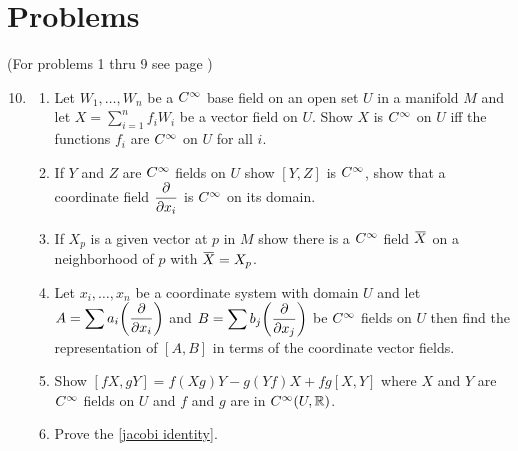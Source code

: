 \documentclass[../main]{subfiles}
\begin{document}
\section*{Problems}

(For problems 1 thru 9 see page \pageref{ch01:ex1})

\begin{enumerate}
\setcounter{enumi}{9}

\item\label{pro:10}
\begin{enumerate}[label=(\roman{enumii})]
    \item Let $W_1,\dots, W_n$ be a $C^\infty$ base field on an open set $U$ in a manifold $M$ and let $X = \sum\limits_{i=1}^{n} f_i W_i$ be a vector field on $U$. Show $X$ is $C^\infty$ on $U$ iff the functions $f_i$ are $C^\infty$ on $U$ for all $i$.
    \item If $Y$ and $Z$ are $C^\infty$ fields on $U$ show $[Y,Z]$ is $C^\infty$, show that a coordinate field $\dfrac{\partial }{\partial x_i}$ is $C^\infty$ on its domain.
    \item If $X_p$ is a given vector at $p$ in $M$ show there is a $C^\infty$ field $\xoverline{X}$ on a neighborhood of $p$ with $\xoverline{X} = X_p$.
    \item Let $x_i, \dots, x_n$ be a coordinate system with domain $U$ and let \newline $A = \displaystyle \sum a_i \bigg(\dfrac{\partial }{\partial x_i}\bigg)$ and $B=\displaystyle \sum b_j \bigg(\dfrac{\partial }{\partial x_j}\bigg)$ be $C^\infty$ fields on $U$ then find the representation of $[A,B]$ in terms of the coordinate vector fields.
    \item Show $[fX,gY] = f(Xg)Y - g(Yf)X + fg[X,Y]$ where $X$ and $Y$ are $C^\infty$ fields on $U$ and $f$ and $g$ are in $C^\infty(U,\mathbb{R})$. 
    \item Prove the \ref{jacobi identity}.
\end{enumerate}



\end{enumerate}
\end{document}
